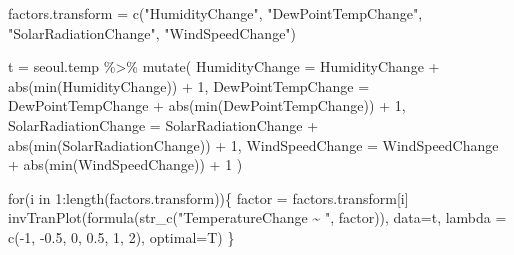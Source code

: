 \documentclass[
  letterpaper,
  DIV=11,
  numbers=noendperiod]{scrartcl}
\newenvironment{Shaded}{\begin{snugshade}}{\end{snugshade}}
\newcommand{\AttributeTok}[1]{\textcolor[rgb]{0.40,0.45,0.13}{#1}}
\newcommand{\ControlFlowTok}[1]{\textcolor[rgb]{0.00,0.23,0.31}{#1}}
\newcommand{\DecValTok}[1]{\textcolor[rgb]{0.68,0.00,0.00}{#1}}
\newcommand{\FloatTok}[1]{\textcolor[rgb]{0.68,0.00,0.00}{#1}}
\newcommand{\FunctionTok}[1]{\textcolor[rgb]{0.28,0.35,0.67}{#1}}
\newcommand{\NormalTok}[1]{\textcolor[rgb]{0.00,0.23,0.31}{#1}}
\newcommand{\OtherTok}[1]{\textcolor[rgb]{0.00,0.23,0.31}{#1}}
\newcommand{\SpecialCharTok}[1]{\textcolor[rgb]{0.37,0.37,0.37}{#1}}
\newcommand{\StringTok}[1]{\textcolor[rgb]{0.13,0.47,0.30}{#1}}
\begin{document}
\begin{Shaded}
\begin{Highlighting}[]
\NormalTok{factors.transform }\OtherTok{=} \FunctionTok{c}\NormalTok{(}\StringTok{"HumidityChange"}\NormalTok{, }\StringTok{"DewPointTempChange"}\NormalTok{, }
                      \StringTok{"SolarRadiationChange"}\NormalTok{, }\StringTok{"WindSpeedChange"}\NormalTok{)}

\NormalTok{t }\OtherTok{=}\NormalTok{ seoul.temp }\SpecialCharTok{\%\textgreater{}\%} \FunctionTok{mutate}\NormalTok{(}
  \AttributeTok{HumidityChange =}\NormalTok{ HumidityChange }\SpecialCharTok{+} \FunctionTok{abs}\NormalTok{(}\FunctionTok{min}\NormalTok{(HumidityChange)) }\SpecialCharTok{+} \DecValTok{1}\NormalTok{,}
  \AttributeTok{DewPointTempChange =}\NormalTok{ DewPointTempChange }\SpecialCharTok{+} \FunctionTok{abs}\NormalTok{(}\FunctionTok{min}\NormalTok{(DewPointTempChange)) }\SpecialCharTok{+} \DecValTok{1}\NormalTok{,}
  \AttributeTok{SolarRadiationChange =}\NormalTok{ SolarRadiationChange }\SpecialCharTok{+} \FunctionTok{abs}\NormalTok{(}\FunctionTok{min}\NormalTok{(SolarRadiationChange)) }\SpecialCharTok{+} \DecValTok{1}\NormalTok{,}
  \AttributeTok{WindSpeedChange =}\NormalTok{ WindSpeedChange }\SpecialCharTok{+} \FunctionTok{abs}\NormalTok{(}\FunctionTok{min}\NormalTok{(WindSpeedChange)) }\SpecialCharTok{+} \DecValTok{1}
\NormalTok{)}

\ControlFlowTok{for}\NormalTok{(i }\ControlFlowTok{in} \DecValTok{1}\SpecialCharTok{:}\FunctionTok{length}\NormalTok{(factors.transform))\{}
\NormalTok{  factor }\OtherTok{=}\NormalTok{ factors.transform[i]}
  \FunctionTok{invTranPlot}\NormalTok{(}\FunctionTok{formula}\NormalTok{(}\FunctionTok{str\_c}\NormalTok{(}\StringTok{"TemperatureChange \textasciitilde{} "}\NormalTok{, factor)), }\AttributeTok{data=}\NormalTok{t, }
            \AttributeTok{lambda =} \FunctionTok{c}\NormalTok{(}\SpecialCharTok{{-}}\DecValTok{1}\NormalTok{, }\SpecialCharTok{{-}}\FloatTok{0.5}\NormalTok{, }\DecValTok{0}\NormalTok{, }\FloatTok{0.5}\NormalTok{, }\DecValTok{1}\NormalTok{, }\DecValTok{2}\NormalTok{), }\AttributeTok{optimal=}\NormalTok{T)}
\NormalTok{\}}
\end{Highlighting}
\end{Shaded}
\end{document}
